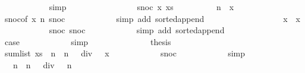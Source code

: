 \begin{isabellebody}
\ \ \ \ \ \ \ \ \ \ \isamarkupfalse%
\ simp\isanewline
\ \ \ \ \ \ \isamarkupfalse%
\isanewline
\ \ \ \ \ \ \ \ \isamarkupfalse%
\ {\isacharparenleft}snoc\ x{\isacharprime}\ xs{\isacharprime}{\isacharparenright}\isanewline
\ \ \ \ \ \ \ \ \isamarkupfalse%
\ {\isachardoublequoteopen}n{\isacharminus}{}\ {\isasymle}\ x{\isacharprime}{\isachardoublequoteclose}\isanewline
\ \ \ \ \ \ \ \ \ \ \isamarkupfalse%
\ snoc{\isacharparenleft}{}{\isacharparenright}{\isacharbrackleft}of\ x{\isacharprime}\ {\isachardoublequoteopen}n{\isacharminus}{}{\isachardoublequoteclose}{\isacharbrackright}\ snoc{\isacharparenleft}{}{\isacharminus}{\isacharparenright}\isanewline
\ \ \ \ \ \ \ \ \ \ \isamarkupfalse%
\ {\isacharparenleft}simp\ add{\isacharcolon}\ sorted{\isacharunderscore}append{\isacharparenright}\isanewline
\ \ \ \ \ \ \ \ \isamarkupfalse%
\isanewline
\ \ \ \ \ \ \ \ \isamarkupfalse%
\ {\isachardoublequoteopen}x\ {\isachargreater}\ x{\isacharprime}{\isachardoublequoteclose}\isanewline
\ \ \ \ \ \ \ \ \ \ \isamarkupfalse%
\ snoc{\isacharparenleft}{}{\isacharparenright}\ snoc{\isacharparenleft}{}{\isacharparenright}\isanewline
\ \ \ \ \ \ \ \ \ \ \isamarkupfalse%
\ {\isacharparenleft}simp\ add{\isacharcolon}\ sorted{\isacharunderscore}append{\isacharparenright}\isanewline
\ \ \ \ \ \ \ \ \isamarkupfalse%
\isanewline
\ \ \ \ \ \ \ \ \isamarkupfalse%
\ {\isacharquery}case\isanewline
\ \ \ \ \ \ \ \ \ \ \isamarkupfalse%
\ simp\isanewline
\ \ \ \ \ \ \isamarkupfalse%
\isanewline
\ \ \ \ \ \ \isamarkupfalse%
\ {\isacharquery}thesis\isanewline
\ \ \ \ \ \ \isamarkupfalse%
{\isacharminus}\isanewline
\ \ \ \ \ \ \ \ \isamarkupfalse%
\ {\isachardoublequoteopen}sum{\isacharunderscore}list\ xs\ {\isasymle}\ n\ {\isacharasterisk}\ {\isacharparenleft}n\ {\isacharplus}\ {}{\isacharparenright}\ div\ {}\ {\isacharminus}\ x{\isachardoublequoteclose}\isanewline
\ \ \ \ \ \ \ \ \ \ \isamarkupfalse%
\ snoc{\isacharparenleft}{}{\isacharparenright}\isanewline
\ \ \ \ \ \ \ \ \ \ \isamarkupfalse%
\ simp\isanewline
\ \ \ \ \ \ \ \ \isamarkupfalse%
\ \isamarkupfalse%
\ {\isachardoublequoteopen}{\isachardot}{\isachardot}{\isachardot}\ {\isasymle}\ n\ {\isacharasterisk}\ {\isacharparenleft}n\ {\isacharplus}\ {}{\isacharparenright}\ div\ {}\ {\isacharminus}\ n{\isachardoublequoteclose}\isanewline

\end{isabellebody}
